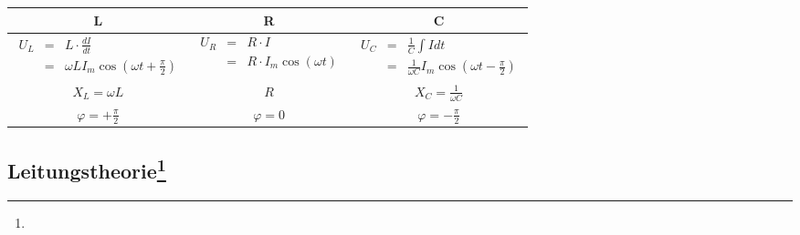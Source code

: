 \documentclass[12pt,a4paper]{article}
\renewcommand{\d}[2]{\frac{d #1}{d #2}}
\renewcommand{\=}[1]{\stackrel{#1}{=}}
\theoremstyle{definition}
\theoremstyle{remark}
\begin{document}
\begin{tabular}{ccc}
\toprule
L & R & C\\
\midrule
$\begin{array}{lcl} U_L &=& L \cdot \d{I}{t} \\ &=& \omega L I_m \cos (\omega t + \frac{\pi}{2}) \end{array}$ & $\begin{array}{lcl}U_R &=& R \cdot I \\ &=& R \cdot I_m \cos (\omega t) \end{array}$ & $\begin{array}{lcl} U_C &=& \frac{1}{C} \int I dt \\ &=& \frac{1}{\omega C} I_m \cos (\omega t - \frac{\pi}{2}) \end{array}$\\
$X_L = \omega L$ & $R$ & $X_C = \frac{1}{\omega C}$\\
$\varphi = +\frac{\pi}{2}$ & $\varphi = 0$ & $\varphi = -\frac{\pi}{2}$\\
\bottomrule
\end{tabular}


\subsection[Leitungstheorie]{Leitungstheorie\let\thefootnote\relax\footnote{}}
\end{document}

